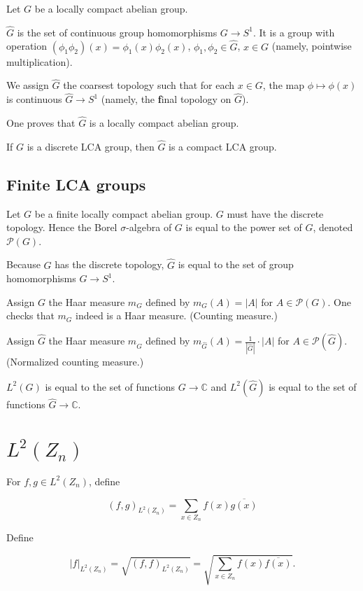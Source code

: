 \documentclass[11pt]{article} %
\begin{document}
Let $G$ be a locally compact abelian group.

$\widehat{G}$ is the set of
continuous group homomorphisms $G \to S^1$. It is a group with operation
$(\phi_1 \phi_2)(x)=\phi_1(x)\phi_2(x)$, $\phi_1,\phi_2 \in \widehat{G}$, $x \in G$ (namely, pointwise multiplication).

We assign $\widehat{G}$ the coarsest topology such that for each $x \in G$, the map $\phi \mapsto \phi(x)$ is continuous $\widehat{G} \to S^1$ (namely, the {\textbf final topology} on $\widehat{G}$).

One proves that $\widehat{G}$ is a locally compact abelian group.

If $G$ is a discrete LCA group, then $\widehat{G}$ is a compact LCA group.

\subsection{Finite LCA groups}

Let $G$ be a finite locally compact abelian group. $G$ must have the discrete topology. Hence the Borel $\sigma$-algebra of $G$ is equal to the power set of $G$, denoted $\mathscr{P}(G)$.

Because $G$ has the discrete topology, $\widehat{G}$ is equal to the set of group homomorphisms $G \to S^1$.

Assign $G$ the Haar measure $m_G$ defined by $m_G(A)=|A|$ for $A \in \mathscr{P}(G)$. One checks that $m_G$ indeed is a Haar measure. (Counting measure.)

Assign $\widehat{G}$ the Haar measure $m_{\widehat{G}}$ defined by
$m_{\widehat{G}}(A)=\frac{1}{|\widehat{G}|} \cdot |A|$ for $A \in \mathscr{P}(\widehat{G})$. (Normalized counting measure.)

$L^2(G)$ is equal to the set of functions $G \to \mathbb{C}$ and $L^2(\widehat{G})$ is equal to the set of functions $\widehat{G} \to \mathbb{C}$.

\section{$L^2(Z_n)$}

For $f,g \in L^2(Z_n)$, define

$$
(f,g)_{L^2(Z_n)} = \sum_{x \in Z_n} f(x) \overline{g(x)} 
$$

Define

$$|f|_{L^2(Z_n)} = \sqrt{(f,f)_{L^2(Z_n)}}=\sqrt{\sum_{x \in Z_n} f(x) \overline{f(x)}}.$$
\end{document}

